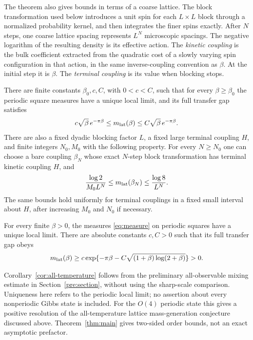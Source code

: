 The theorem also gives bounds in terms of a coarse lattice. The block
transformation used below introduces a unit spin for each $L\times L$
block through a normalized probability kernel, and then integrates the
finer spins exactly. After $N$ steps, one coarse lattice spacing
represents $L^N$ microscopic spacings. The negative logarithm of the
resulting density is its effective action. The \emph{kinetic coupling}
is the bulk coefficient extracted from the quadratic cost of a slowly
varying spin configuration in that action, in the same inverse-coupling convention
as $\beta$. At the initial step it is $\beta$. The
\emph{terminal coupling} is its value when blocking stops.

\begin{theorem}
\label{thm:main}
There are finite constants $\beta_0,c,C$, with $0<c<C$, such that for
every $\beta\ge\beta_0$ the periodic square measures have a unique local
limit, and its full transfer gap satisfies
\begin{equation}
\label{eq:target}
 c\sqrt\beta\,e^{-\pi\beta}\le m_{\mathrm{lat}}(\beta)
            \le C\sqrt\beta\,e^{-\pi\beta}.
\end{equation}
There are also a fixed dyadic blocking factor $L$, a fixed large
terminal coupling $H$, and finite integers $N_0,M_0$ with the following
property. For every $N\ge N_0$ one can choose a bare coupling
$\beta_N$ whose exact $N$-step block transformation has terminal
kinetic coupling $H$, and
\begin{equation}
\label{eq:depth-bounds}
 \frac{\log2}{M_0L^N}\le m_{\mathrm{lat}}(\beta_N)
                  \le\frac{\log8}{L^N}.
\end{equation}
The same bounds hold uniformly for terminal couplings in a fixed small
interval about $H$, after increasing $M_0$ and $N_0$ if necessary.
\end{theorem}

\begin{corollary}
\label{cor:all-temperature}
For every finite $\beta>0$, the measures \eqref{eq:measure} on periodic
squares have a unique local limit. There are absolute constants $c,C>0$
such that its full transfer gap obeys
\[
 m_{\mathrm{lat}}(\beta)\ge c\exp\{-\pi\beta-
 C\sqrt{(1+\beta)\log(2+\beta)}\}>0.
\]
\end{corollary}

Corollary~\ref{cor:all-temperature} follows from the preliminary
all-observable mixing estimate in Section~\ref{pre:section}, without
using the sharp-scale comparison. Uniqueness here refers to the periodic
local limit; no assertion about every nonperiodic Gibbs state is included.
For the $O(4)$ periodic state this gives a positive resolution of the
all-temperature lattice mass-generation conjecture discussed above.
Theorem~\ref{thm:main} gives two-sided order bounds, not an exact
asymptotic prefactor.

